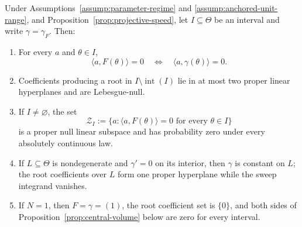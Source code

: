 \begin{lemma}
\label{lem:central-null-classes}
Under Assumptions~\ref{assump:parameter-regime} and
\ref{assump:anchored-unit-range}, and
Proposition~\ref{prop:projective-speed}, let $I\subseteq\Theta$ be an
interval and write $\gamma=\gamma_F$.  Then:
\begin{enumerate}
\item For every $a$ and $\theta\in I$,
\begin{equation}
\langle a,F(\theta)\rangle=0
\quad\Longleftrightarrow\quad
\langle a,\gamma(\theta)\rangle=0.
\label{eq:appendix-2}
\end{equation}
\item Coefficients producing a root in
$I\setminus\operatorname{int}(I)$ lie in at most two proper linear
hyperplanes and are Lebesgue-null.
\item If $I\neq\varnothing$, the set
\[
\mathcal Z_I:=\{a:\langle a,F(\theta)\rangle=0
                  \text{ for every }\theta\in I\}
\]
is a proper null linear subspace and has probability zero under every
absolutely continuous law.
\item If $L\subseteq\Theta$ is nondegenerate and $\gamma'=0$ on its
interior, then $\gamma$ is constant on $L$; the root coefficients over $L$
form one proper hyperplane while the sweep integrand vanishes.
\item If $N=1$, then $F=\gamma=(1)$, the root coefficient set is $\{0\}$,
and both sides of Proposition~\ref{prop:central-volume} below are zero for
every interval.
\end{enumerate}
\end{lemma}


